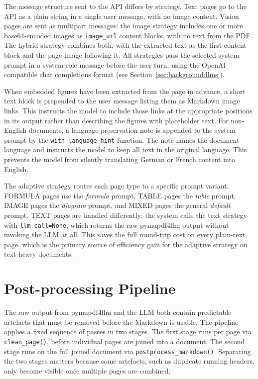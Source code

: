 The message structure sent to the API differs by strategy. Text pages go to the
API as a plain string in a single user message, with no image content. Vision
pages are sent as multipart messages: the image strategy includes one or more
base64-encoded images as \texttt{image\_url} content blocks, with no text from
the PDF. The hybrid strategy combines both, with the extracted text as the first
content block and the page image following it. All strategies pass the selected
system prompt in a system-role message before the user turn, using the
OpenAI-compatible chat completions format (see Section~\ref{sec:background:llms}).

When embedded figures have been extracted from the page in advance, a short text block is prepended to the user message listing them as Markdown image links.
This instructs the model to include those links at the appropriate positions in its output rather than describing the figures with placeholder text.
For non-English documents, a language-preservation note is appended to the system prompt by the \texttt{with\_language\_hint} function.
The note names the document language and instructs the model to keep all text in the original language.
This prevents the model from silently translating German or French content into English.

The adaptive strategy routes each page type to a specific prompt variant.
FORMULA pages use the \textit{formula} prompt, TABLE pages the \textit{table} prompt, IMAGE pages the \textit{diagram} prompt, and MIXED pages the general \textit{default} prompt.
TEXT pages are handled differently: the system calls the text strategy with \texttt{llm\_call=None}, which returns the raw pymupdf4llm output without invoking the LLM at all.
This saves the full round-trip cost on every plain-text page, which is the primary source of efficiency gain for the adaptive strategy on text-heavy documents.

\section{Post-processing Pipeline}

The raw output from pymupdf4llm and the LLM both contain predictable artefacts that must be removed before the Markdown is usable.
The pipeline applies a fixed sequence of passes in two stages.
The first stage runs per page via \texttt{clean\_page()}, before individual pages are joined into a document.
The second stage runs on the full joined document via \texttt{postprocess\_markdown()}.
Separating the two stages matters because some artefacts, such as duplicate running headers, only become visible once multiple pages are combined.

